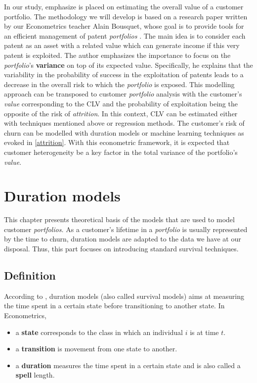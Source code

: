 \documentclass[
]{book}
\providecommand{\tightlist}{%
  \setlength{\itemsep}{0pt}\setlength{\parskip}{0pt}}
\begin{document}
In our study, emphasize is placed on estimating the overall value of a customer portfolio. The methodology we will develop is based on a research paper written by our Econometrics teacher Alain Bousquet, whose goal is to provide tools for an efficient management of patent \emph{portfolios} \citep{BREVETS}. The main idea is to consider each patent as an asset with a related value which can generate income if this very patent is exploited. The author emphasizes the importance to focus on the \emph{portfolio}'s \textbf{variance} on top of its expected value. Specifically, he explains that the variability in the probability of success in the exploitation of patents leads to a decrease in the overall risk to which the \emph{portfolio} is exposed. This modelling approach can be transposed to customer \emph{portfolio} analysis with the customer's \emph{value} corresponding to the CLV and the probability of exploitation being the opposite of the risk of \emph{attrition}. In this context, CLV can be estimated either with techniques mentioned above or regression methods. The customer's risk of churn can be modelled with duration models or machine learning techniques as evoked in \ref{attrition}. With this econometric framework, it is expected that customer heterogeneity be a key factor in the total variance of the portfolio's \emph{value}.

\hypertarget{duration}{%
\chapter{Duration models}\label{duration}}

This chapter presents theoretical basis of the models that are used to model customer \emph{portfolios.} As a customer's lifetime in a \emph{portfolio} is usually represented by the time to churn, duration models are adapted to the data we have at our disposal. Thus, this part focuses on introducing standard survival techniques.

\hypertarget{definition}{%
\section{Definition}\label{definition}}

According to \citet{CAMERON_TRIVEDI}, duration models (also called survival models) aims at measuring the time spent in a certain state before transitioning to another state. In Econometrics,

\begin{itemize}
\tightlist
\item
  a \textbf{state} corresponds to the class in which an individual \(i\) is at time \(t\).
\item
  a \textbf{transition} is movement from one state to another.
\item
  a \textbf{duration} measures the time spent in a certain state and is also called a \textbf{spell} length.
\end{itemize}
\end{document}
